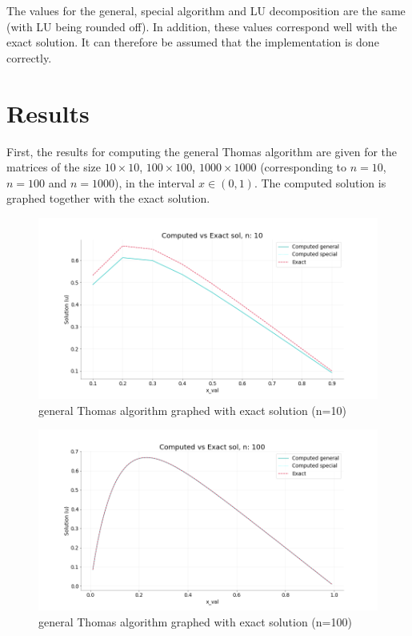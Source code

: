\documentclass[%
oneside,                 %
final,                   %
10pt]{article}
\begin{document}
The values for the general, special algorithm and LU decomposition are the same (with LU being rounded off). In addition, these values correspond well with the exact solution. It can therefore be assumed that the implementation is done correctly.
\section*{Results}
First, the results for computing the general Thomas algorithm are given for the matrices of the size $10 \times 10$, $100 \times 100$, $1000 \times 1000$ (corresponding to $n=10$, $n=100$ and $n=1000$), in the interval $x \in (0,1)$. The computed solution is graphed together with the exact solution.

\begin{figure}[H]
\begin{center}
\graphicspath{ {ComputedvsExact/} }
\includegraphics[width=13cm]{ComputedvsExact_sol_n10.png}
\caption{general Thomas algorithm graphed with exact solution (n=10)}
\end{center}
\label{fig:ComvsEx_n10}
\end{figure}

\begin{figure}[H]
\begin{center}
\graphicspath{ {ComputedvsExact/} }
\includegraphics[width=13cm]{ComputedvsExact_sol_n100.png}
\caption{general Thomas algorithm graphed with exact solution (n=100)}
\end{center}
\end{figure}
\end{document}
